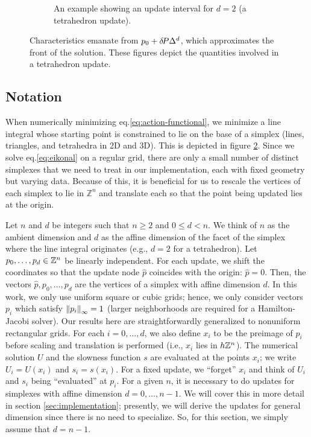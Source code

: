 \documentclass[smallcondensed]{svjour3}
\begin{document}
\begin{figure}
\begin{subfigure}{.44\textwidth}
    \caption{An example showing an update interval for $d = 2$ (a
      tetrahedron update).}\label{fig:tetra-diagram}
  \end{subfigure}
  \caption{Characteristics emanate from $p_0 + {\delta \hspace{-0.14em} P} \Delta^d$, which
    approximates the front of the solution. These figures depict the
    quantities involved in a tetrahedron
    update.}\label{fig:simplex-diagrams}
\end{figure}

\subsection{Notation}\label{ssec:notation}

When numerically minimizing eq.\@ \ref{eq:action-functional}, we
minimize a line integral whose starting point is constrained to lie on
the base of a simplex (lines, triangles, and tetrahedra in 2D and
3D). This is depicted in figure \ref{fig:simplex-diagrams}. Since we
solve eq.\@ \ref{eq:eikonal} on a regular grid, there are only a
small number of distinct simplexes that we need to treat in our
implementation, each with fixed geometry but varying data. Because of
this, it is beneficial for us to rescale the vertices of each simplex
to lie in $\mathbb{Z}^n$ and translate each so that the point being
updated lies at the origin.

Let $n$ and $d$ be integers such that $n \geq 2$ and $0 \leq d <
n$. We think of $n$ as the ambient dimension and $d$ as the affine
dimension of the facet of the simplex where the line integral
originates (e.g., $d = 2$ for a tetrahedron). Let
$p_0, \hdots, p_d \in \mathbb{Z}^n$ be linearly independent. For each update,
we shift the coordinates so that the update node $\hat{p}$ coincides
with the origin: $\hat{p} = 0$. Then, the vectors
$\hat{p}, p_0, \hdots, p_d$ are the vertices of a simplex with affine
dimension $d$. In this work, we only use uniform square or cubic
grids; hence, we only consider vectors $p_i$ which satisfy
$\left\|p_i\right\|_\infty = 1$ (larger neighborhoods are required for a
Hamilton-Jacobi solver). Our results here are straightforwardly
generalized to nonuniform rectangular grids. For each
$i = 0, \hdots, d$, we also define $x_i$ to be the preimage of $p_i$
before scaling and translation is performed (i.e., $x_i$ lies in
$h \mathbb{Z}^n$). The numerical solution $U$ and the slowness function $s$
are evaluated at the points $x_i$; we write $U_i = U(x_i)$ and
$s_i = s(x_i)$. For a fixed update, we ``forget'' $x_i$ and think of
$U_i$ and $s_i$ being ``evaluated'' at $p_i$. For a given $n$, it is
necessary to do updates for simplexes with affine dimension
$d = 0, \hdots, n - 1$. We will cover this in more detail in section\@
\ref{sec:implementation}; presently, we will derive the updates for
general dimension since there is no need to specialize. So, for this
section, we simply assume that $d = n - 1$.
\end{document}

